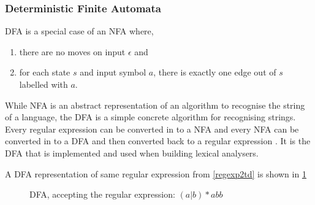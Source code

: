 \subsubsection{Deterministic Finite Automata}
DFA is a special case of an NFA where,
\begin{enumerate}
  \item there are no moves on input $\epsilon$ and
  \item for each state $s$ and input symbol $a$, there is exactly one edge out
        of $s$ labelled with $a$.
\end{enumerate}
While NFA is an abstract representation of an algorithm to recognise the string 
of a language, the DFA is a simple concrete algorithm for recognising strings. 
Every regular expression can be converted in to a NFA and every NFA can be 
converted in to a DFA and then converted back to a regular expression \cite{Aho2006}. 
It is the DFA that is implemented and 
used when building lexical analysers. 
\begin{example} \label{regexp2dfa}
A DFA representation of same regular expression from \cref{regexp2td} is shown in \cref{fig:dfa}
\end{example}
\begin{figure}[!h]
  \centering
  \caption{DFA, accepting the regular expression: $(a | b)* abb$
  \label{fig:dfa}}
\end{figure}

 
